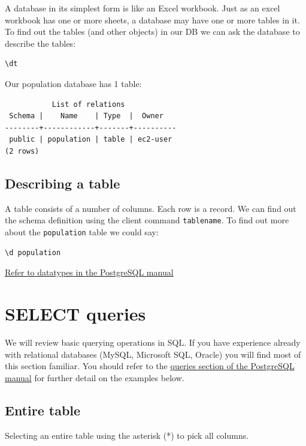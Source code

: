 \documentclass{pgnotes}
\begin{document}
A database in its simplest form is like an Excel workbook.
Just as an excel workbook has one or more sheets, a database may have one or more tables in it.
To find out the tables (and other objects) in our DB we can ask the database to describe the tables:

\begin{verbatim}
\dt
\end{verbatim}

Our population database has 1 table:

\begin{verbatim}
           List of relations
 Schema |    Name    | Type  |  Owner   
--------+------------+-------+----------
 public | population | table | ec2-user
(2 rows)
\end{verbatim}

\subsection{Describing a table}\label{describing-a-table}

A table consists of a number of columns. Each row is a record. We can
find out the schema definition using the client command
\texttt{tablename}. To find out more about the \texttt{population} table
we could say:

\begin{verbatim}
\d population
\end{verbatim}

\href{https://www.postgresql.org/docs/13/datatype.html}{Refer to
datatypes in the PostgreSQL manual}

\section{SELECT queries}\label{select-queries}

We will review basic querying operations in SQL.
If you have experience already with relational databases (MySQL, Microsoft SQL, Oracle) you will find most of this section familiar.
You should refer to the \href{https://www.postgresql.org/docs/13/queries.html}{queries section of the PostgreSQL manual} for further detail on the examples below.

\subsection{Entire table}\label{entire-table}

Selecting an entire table using the asterisk (*) to pick all columns.
\end{document}
